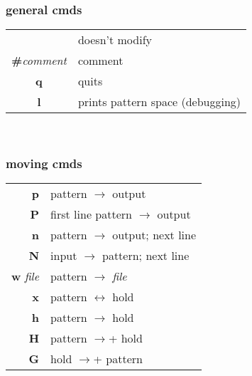 \documentclass[12pt, a4paper]{article}
\begin{document}
\begin{center}
    \begin{minipage}[t]{.5\textwidth}
        \centering 
        \subsubsection*{general cmds}
        \begin{tabular}{c | l}
            \textbf{ } & doesn't modify \\
            \textbf{\#}\textit{comment} & comment \\
            \textbf{q} & quits \\ 
            \textbf{l} & prints pattern space (debugging) \\ 
        \end{tabular}\\

    \end{minipage}%
    \begin{minipage}[t]{.5\textwidth}
        \centering
        \subsubsection*{moving cmds}
        \begin{tabular}{r | l}
            \textbf{p} & pattern $\rightarrow$ output \\
            \textbf{P} & first line pattern $\rightarrow$ output \\
            \textbf{n} & pattern $\rightarrow$ output; next line \\
            \textbf{N} & input $\rightarrow$ pattern; next line \\
            \textbf{w} \textit{file} & pattern $\rightarrow$ \textit{file} \\
            \textbf{x} & pattern $\leftrightarrow$ hold \\
            \textbf{h} & pattern $\rightarrow$ hold \\
            \textbf{H} & pattern $\rightarrow$+ hold \\
            \textbf{G} & hold $\rightarrow$+ pattern \\
        \end{tabular}\\

    \end{minipage}
\end{center}
\end{document}
